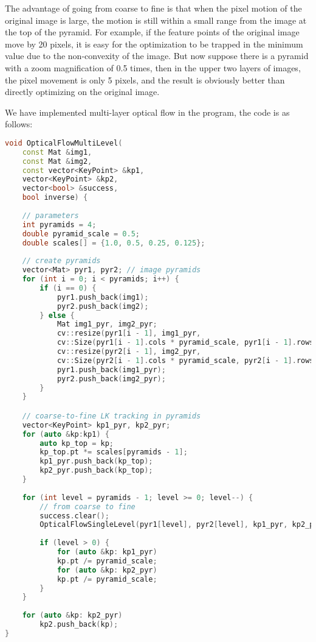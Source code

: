 The advantage of going from coarse to fine is that when the pixel motion of the original image is large, the motion is still within a small range from the image at the top of the pyramid. For example, if the feature points of the original image move by 20 pixels, it is easy for the optimization to be trapped in the minimum value due to the non-convexity of the image. But now suppose there is a pyramid with a zoom magnification of 0.5 times, then in the upper two layers of images, the pixel movement is only 5 pixels, and the result is obviously better than directly optimizing on the original image.

We have implemented multi-layer optical flow in the program, the code is as follows:
\begin{lstlisting}[language=c++,caption=slambook2/ch8/optical_flow.cpp (snippet)]
void OpticalFlowMultiLevel(
	const Mat &img1,
	const Mat &img2,
	const vector<KeyPoint> &kp1,
	vector<KeyPoint> &kp2,
	vector<bool> &success,
	bool inverse) {
	
	// parameters
	int pyramids = 4;
	double pyramid_scale = 0.5;
	double scales[] = {1.0, 0.5, 0.25, 0.125};
	
	// create pyramids
	vector<Mat> pyr1, pyr2; // image pyramids
	for (int i = 0; i < pyramids; i++) {
		if (i == 0) {
			pyr1.push_back(img1);
			pyr2.push_back(img2);
		} else {
			Mat img1_pyr, img2_pyr;
			cv::resize(pyr1[i - 1], img1_pyr,
			cv::Size(pyr1[i - 1].cols * pyramid_scale, pyr1[i - 1].rows * pyramid_scale));
			cv::resize(pyr2[i - 1], img2_pyr,
			cv::Size(pyr2[i - 1].cols * pyramid_scale, pyr2[i - 1].rows * pyramid_scale));
			pyr1.push_back(img1_pyr);
			pyr2.push_back(img2_pyr);
		}
	}

	// coarse-to-fine LK tracking in pyramids
	vector<KeyPoint> kp1_pyr, kp2_pyr;
	for (auto &kp:kp1) {
		auto kp_top = kp;
		kp_top.pt *= scales[pyramids - 1];
		kp1_pyr.push_back(kp_top);
		kp2_pyr.push_back(kp_top);
	}
	
	for (int level = pyramids - 1; level >= 0; level--) {
		// from coarse to fine
		success.clear();
		OpticalFlowSingleLevel(pyr1[level], pyr2[level], kp1_pyr, kp2_pyr, success, inverse, true);
		
		if (level > 0) {
			for (auto &kp: kp1_pyr)
			kp.pt /= pyramid_scale;
			for (auto &kp: kp2_pyr)
			kp.pt /= pyramid_scale;
		}
	}
	
	for (auto &kp: kp2_pyr)
		kp2.push_back(kp);
}
\end{lstlisting}

